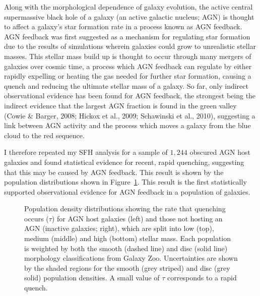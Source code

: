 \documentclass[12pt]{article}
\begin{document}
Along with the morphological dependence of galaxy evolution, the active central supermassive black hole of a galaxy (an active galactic nucleus; AGN) is thought to affect a galaxy's star formation rate in a process known as AGN feedback. AGN feedback was first suggested as a mechanism for regulating star formation due to the results of simulations wherein galaxies could grow to unrealistic stellar masses. This stellar mass build up is thought to occur through many mergers of galaxies over cosmic time, a process which AGN feedback can regulate by either rapidly expelling or heating the gas needed for further star formation, causing a quench and reducing the ultimate stellar mass of a galaxy. So far, only indirect observational evidence has been found for AGN feedback, the strongest being the indirect evidence that the largest AGN fraction is found in the green valley (Cowie \& Barger, 2008; Hickox et al., 2009; Schawinski et al., 2010), suggesting a link between AGN activity and the process which moves a galaxy from the blue cloud to the red sequence.

I therefore repeated my SFH analysis for a sample of $1,244$ obscured AGN host galaxies and found statistical evidence for recent, rapid quenching, suggesting that this may be caused by AGN feedback. This result is shown by the population distributions shown in Figure~\ref{fig:agnfeedback}. This result is the first statistically supported observational evidence for AGN feedback in a population of galaxies. 

\begin{figure}
\caption{Population density distributions showing the rate that quenching occurs ($\tau$) for AGN host galaxies (left) and those not hosting an AGN (inactive galaxies; right), which are split into low (top), medium (middle) and high (bottom) stellar mass. Each population is weighted by both the smooth (dashed line) and disc (solid line) morphology classifications from Galaxy Zoo. Uncertainties  are shown by the shaded regions for the smooth (grey striped) and disc (grey solid) population densities. A small value of $\tau$ corresponds to a rapid quench.}
\label{fig:agnfeedback}
\end{figure}
\end{document}
